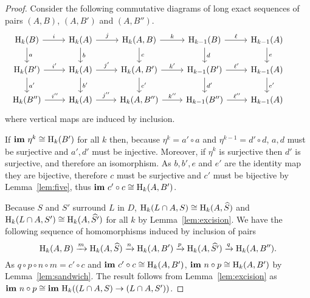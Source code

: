 \begin{proof}
  Consider the following commutative diagrams of long exact sequences of pairs $(A, B)$, $(A, B')$ and $(A, B'')$.
  \begin{equation}\begin{tikzcd}\label{dgm:separate_iso}
    \hom_k(B)\arrow{r}{i}\arrow{d}{a} &
    \hom_k(A)\arrow{r}{j}\arrow{d}{b} &
    \hom_k(A, B)\arrow{r}{k}\arrow{d}{c} &
    \hom_{k-1}(B)\arrow{r}{\ell}\arrow{d}{d} &
    \hom_{k-1}(A)\arrow{d}{e} &\\
    \hom_k(B')\arrow{r}{i'}\arrow{d}{a'} &
    \hom_k(A)\arrow{r}{j'}\arrow{d}{b'} &
    \hom_k(A, B')\arrow{r}{k'}\arrow{d}{c'} &
    \hom_{k-1}(B')\arrow{r}{\ell'}\arrow{d}{d'} &
    \hom_{k-1}(A)\arrow{d}{e'} \\
    \hom_k(B'')\arrow{r}{i''}&
    \hom_k(A)\arrow{r}{j''}&
    \hom_k(A, B'')\arrow{r}{k''}&
    \hom_{k-1}(B'')\arrow{r}{\ell''} &
    \hom_{k-1}(A)
  \end{tikzcd}\end{equation}
  where vertical maps are induced by inclusion.

  If $\mathbf{im}~\eta^k\cong\mathrm{H}_k(B')$ for all $k$ then, because $\eta^k = a'\circ a$ and $\eta^{k-1} = d'\circ d$, $a, d$ must be surjective and $a', d'$ must be injective.
  Moreover, if $\eta^k$ is surjective then $d'$ is surjective, and therefore an isomorphism.
  As $b,b',e$ and $e'$ are the identity map they are bijective, therefore $c$ must be surjective and $c'$ must be bijective by Lemma~\ref{lem:five}, thus $\mathbf{im}~c'\circ c\cong \mathrm{H}_k(A, B')$.

  Because $S$ and $S'$ surround $L$ in $D$, $\mathrm{H}_k(L\cap A, S)\cong \mathrm{H}_k(A, \widehat{S})$ and $\mathrm{H}_k(L\cap A, S')\cong \mathrm{H}_k(A, \widehat{S'})$ for all $k$ by Lemma~\ref{lem:excision}.
  We have the following sequence of homomorphisms induced by inclusion of pairs
  \[ \mathrm{H}_k(A, B)\xrightarrow{m}\mathrm{H}_k(A, \widehat{S})\xrightarrow{n}\mathrm{H}_k(A, B')\xrightarrow{p}\mathrm{H}_k(A, \widehat{S'})\xrightarrow{q}\mathrm{H}_k(A, B'').\]
  As $q\circ p\circ n\circ m = c' \circ c$ and $\mathbf{im}~c'\circ c\cong \mathrm{H}_k(A, B')$, $\mathbf{im}~n\circ p\cong \mathrm{H}_k(A, B')$ by Lemma~\ref{lem:sandwich}.
  The result follows from Lemma~\ref{lem:excision} as $\mathbf{im}~n\circ p\cong \mathbf{im}~\mathrm{H}_k((L\cap A, S)\to (L\cap A, S'))$.

\end{proof}

